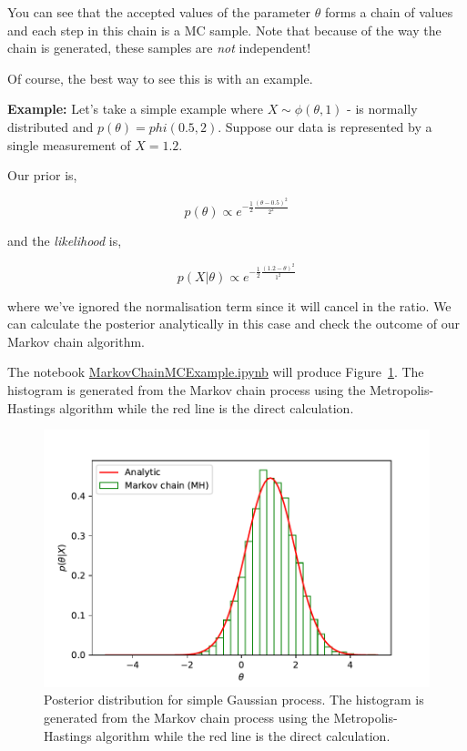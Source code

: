 You can see that the accepted values of the parameter $\theta$ forms a 
chain of values and each step in this chain is a MC sample. Note that 
because of the way the chain is generated, these  samples are \emph{not} 
independent!

Of course, the best way to see this is with an example.   

\begin{tcolorbox}[colback=backblue]
    \textbf{Example:} Let's take a simple example 
    where $X\sim \phi(\theta,1)$ - is normally 
    distributed and $p(\theta)=phi(0.5,2)$. Suppose 
    our data is represented by a single measurement of $X=1.2$.

    Our prior is,
    
    \begin{equation}
    p(\theta)\propto e^{-\frac{1}{2}\frac{(\theta-0.5)^{2}}{2^{2}}}
    \end{equation}
    
    and the \emph{likelihood} is, 
    
    \begin{equation}
    p(X|\theta)\propto e^{-\frac{1}{2}\frac{(1.2-\theta)^{2}}{1^{2}}}
    \end{equation}
    
    where we've ignored the normalisation term since it will cancel 
    in the ratio. We can calculate the posterior analytically in this 
    case and check the outcome  of our Markov chain algorithm. 

    The notebook \href{https://github.com/nucleosynthesis/PGStatistics/blob/main/notebooks/MarkovChainMCExample.ipynb}{MarkovChainMCExample.ipynb} 
    will produce Figure~\ref{fig:mcmcmhex}. The histogram is generated 
    from the Markov chain process using the Metropolis-Hastings algorithm 
    while the red line is the direct calculation. 
\end{tcolorbox}

\begin{figure}[hbt!]
    \centering
    \includegraphics[width=\textwidth]{figures/Probability/markovchainexample.pdf}
    \caption{Posterior distribution  for simple Gaussian process. 
    The histogram is generated 
    from the Markov chain process using the 
    Metropolis-Hastings algorithm 
    while the red line is the direct calculation. }
    \label{fig:mcmcmhex}
\end{figure}

